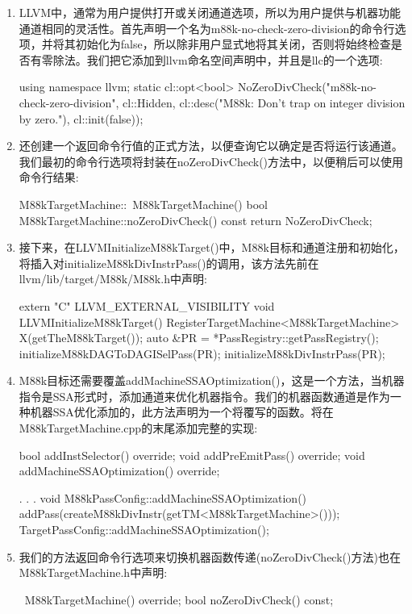 \begin{enumerate}
\item
LLVM中，通常为用户提供打开或关闭通道选项，所以为用户提供与机器功能通道相同的灵活性。首先声明一个名为m88k-no-check-zero-division的命令行选项，并将其初始化为false，所以除非用户显式地将其关闭，否则将始终检查是否有零除法。我们把它添加到llvm命名空间声明中，并且是llc的一个选项:

\begin{cpp}
using namespace llvm;
static cl::opt<bool>
    NoZeroDivCheck("m88k-no-check-zero-division", cl::Hidden,
                    cl::desc("M88k: Don't trap on integer division by zero."),
                    cl::init(false));
\end{cpp}

\item
还创建一个返回命令行值的正式方法，以便查询它以确定是否将运行该通道。我们最初的命令行选项将封装在noZeroDivCheck()方法中，以便稍后可以使用命令行结果:

\begin{cpp}
M88kTargetMachine::~M88kTargetMachine() {}
bool M88kTargetMachine::noZeroDivCheck() const { return NoZeroDivCheck; }
\end{cpp}

\item
接下来，在LLVMInitializeM88kTarget()中，M88k目标和通道注册和初始化，将插入对initializeM88kDivInstrPass()的调用，该方法先前在llvm/lib/target/M88k/M88k.h中声明:

\begin{cpp}
extern "C" LLVM_EXTERNAL_VISIBILITY void
LLVMInitializeM88kTarget() {
    RegisterTargetMachine<M88kTargetMachine> X(getTheM88kTarget());
    auto &PR = *PassRegistry::getPassRegistry();
    initializeM88kDAGToDAGISelPass(PR);
    initializeM88kDivInstrPass(PR);
}
\end{cpp}

\item
M88k目标还需要覆盖addMachineSSAOptimization()，这是一个方法，当机器指令是SSA形式时，添加通道来优化机器指令。我们的机器函数通道是作为一种机器SSA优化添加的，此方法声明为一个将覆写的函数。将在M88kTargetMachine.cpp的末尾添加完整的实现:

\begin{cpp}
    bool addInstSelector() override;
    void addPreEmitPass() override;
    void addMachineSSAOptimization() override;

. . .
void M88kPassConfig::addMachineSSAOptimization() {
    addPass(createM88kDivInstr(getTM<M88kTargetMachine>()));
    TargetPassConfig::addMachineSSAOptimization();
}
\end{cpp}

\item
我们的方法返回命令行选项来切换机器函数传递(noZeroDivCheck()方法)也在M88kTargetMachine.h中声明:

\begin{cpp}
    ~M88kTargetMachine() override;
    bool noZeroDivCheck() const;
\end{cpp}
\end{enumerate}

